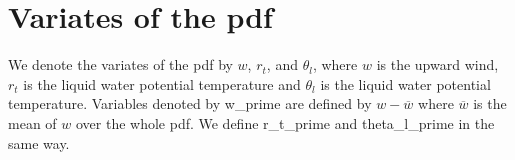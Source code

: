 \section{Variates of the pdf}\label{sec:pdf_variates}

We denote the variates of the \gls{pdf} by $w$, $r_t$, and $\theta_l$,
where $w$ is the upward wind, $r_t$ is the liquid water potential
temperature and $\theta_l$ is the liquid water potential temperature\autocite[p. 10]{larson2022clubbsilhs}.
Variables denoted by \gls{w_prime} are defined by $w - \overline{w}$
where $\overline{w}$ is the mean of $w$ over the whole pdf.
We define \gls{r_t_prime} and \gls{theta_l_prime} in the same way.